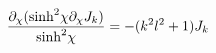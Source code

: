 \begin{equation}
\frac{\partial_{\chi}(\hbox{sinh}^2 \chi \partial_\chi J_k)}{\hbox{sinh}^2\chi}=-(k^2l^2+1)J_k
\end{equation}

